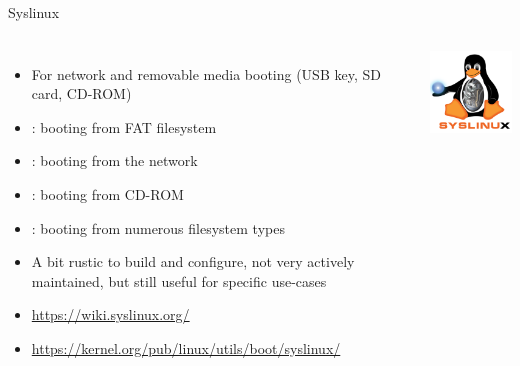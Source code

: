 \begin{frame}{Syslinux}
  \begin{columns}
    \begin{itemize}
    \item For network and removable media booting (USB key, SD card, CD-ROM)
    \item {}: booting from FAT filesystem
    \item {}: booting from the network
    \item {}: booting from CD-ROM
    \item {}: booting from numerous filesystem types
    \item A bit rustic to build and configure, not very actively
      maintained, but still useful for specific use-cases
    \item \url{https://wiki.syslinux.org/}
    \item \url{https://kernel.org/pub/linux/utils/boot/syslinux/}
    \end{itemize}
    \includegraphics[width=\textwidth]{slides/sysdev-bootloaders-sequence/syslinux.png}
  \end{columns}
\end{frame}

